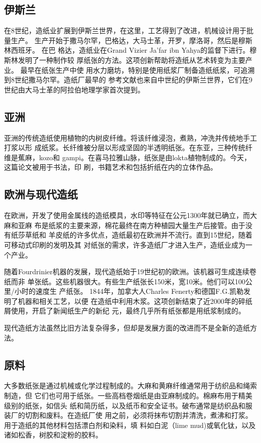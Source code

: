 \documentclass[11pt]{article}
\begin{document}
\subsection{伊斯兰}
\label{sec:org1fb37f7}
在8世纪，造纸业扩展到伊斯兰世界，在这里，工艺得到了改进，机械设计用于批量生产。
生产开始于撒马尔罕，巴格达，大马士革，开罗，摩洛哥，然后是穆斯林西班牙。
\cite{Mahdavi_2003} 在巴
格达，造纸业在Grand Vizier Ja'far ibn Yahya的监督下进行。穆斯林发明了一种制作较
厚纸张的方法。这项创新帮助将造纸从艺术转变为主要产业。
\cite{a_study_of_the_ancient_craft,Mahdavi_2003}  最早在纸张生产中使
用水力磨坊，特别是使用纸浆厂制备造纸纸浆，可追溯到8世纪撒马尔罕。造纸厂最早的
参考文献也来自中世纪的伊斯兰世界，它们在9世纪由大马士革的阿拉伯地理学家首次提到。

\subsection{亚洲}
\label{sec:org5aea3b7}
亚洲的传统造纸使用植物的内树皮纤维。将该纤维浸泡，煮熟，冲洗并传统地手工打浆以形
成纸浆。长纤维被分层以形成坚固的半透明纸张。在东亚，三种传统纤维是蕉麻，kozo和
gampi。在喜马拉雅山脉，纸张是由lokta植物制成的。今天，这篇论文被用于书法，印
刷，书籍艺术和包括折纸在内的立体作品。

\subsection{欧洲与现代造纸}
\label{sec:org297b497}
在欧洲，开发了使用金属线的造纸模具，水印等特征在公元1300年就已确立，而大麻和亚麻
布是纸浆的主要来源，棉花最终在南方种植园大量生产后接管。由于没有纸莎草纸和
羊皮纸的许多优点，造纸最初在欧洲并不流行。直到15世纪，随着可移动式印刷的发明及其
对纸张的需求，许多造纸厂才进入生产，造纸业成为一个产业。

随着Fourdrinier机器的发展，现代造纸始于19世纪初的欧洲。该机器可生成连续卷纸而非
单张纸。这些机器很大。有些生产纸张长150米，宽10米。他们可以100公里/小时的速度生
产纸张。 1844年，加拿大人Charles Fenerty和德国F.G.凯勒发明了机器和相关工艺，以便
在造纸中利用木浆。这项创新结束了近2000年的碎纸屑使用，开启了新闻纸生产的新纪
元，最终几乎所有纸张都是用纸浆制成的。

现代造纸方法虽然比旧方法复杂得多，但却是发展方面的改进而不是全新的造纸方法。

\subsection{原料}
\label{sec:org3ae0676}
大多数纸张是通过机械或化学过程制成的。大麻和黄麻纤维通常用于纺织品和绳索制造，但
它们也可用于纸张。一些高档卷烟纸是由亚麻制成的。棉麻布用于精美级别的纸张，如信头
纸和简历纸，以及纸币和安全证书。破布通常是纺织品和服装厂的切割和废料。在造纸厂使
用之前，必须将抹布切割并清洗，煮沸和打浆。用于造纸的其他材料包括漂白剂和染料，填
料如白泥（lime mud)或氧化钛，以及诸如松香，树胶和淀粉的胶料。
\end{document}

